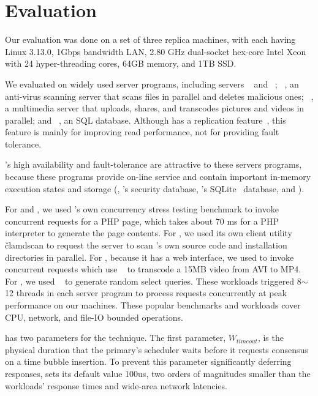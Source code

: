\section{Evaluation} \label{sec:eval}

Our evaluation was done on a set of three replica machines, with each having 
Linux 3.13.0, 1Gbps bandwidth LAN, 2.80 GHz dual-socket hex-core Intel Xeon 
with 24 hyper-threading cores, 64GB memory, and 1TB SSD.

We evaluated \xxx on \nprog widely used server programs, 
including \http servers \apache~\cite{apache} and \mongoose~\cite{mongoose}; 
\clamav~\cite{clamav}, an anti-virus scanning 
server that scans files in parallel and deletes malicious ones; 
\mediatomb~\cite{mediatomb}, a \upnp multimedia server that uploads, shares, 
and transcodes pictures and videos in parallel; and \mysql~\cite{mysql}, an 
SQL database. Although \mysql has a replication 
feature~\cite{mysql:replication}, this feature is mainly for improving read 
performance, not for providing \smr fault tolerance.

\smr's high availability and fault-tolerance are attractive to these 
servers programs, because these programs provide on-line service and contain 
important in-memory execution states and storage (\eg, \clamav's 
security database, \mediatomb's SQLite~\cite{sqlite} database, and \mysql).

For \apache and \mongoose, we used \apache's own concurrency stress testing 
benchmark \ab to invoke concurrent \http requests for a PHP page, which takes 
about 70 ms for a PHP interpreter to generate the page contents. For \clamav, 
we used its own client utility \v{clamdscan} to request the server to scan 
\clamav's own source code and installation directories in parallel. For 
\mediatomb, because it has a web interface, we used \ab to invoke concurrent 
requests which use \mencoder~\cite{mencoder} to transcode a 15MB video from AVI 
to MP4. For \mysql, we used \sysbench~\cite{sysbench} to generate random select 
queries. These workloads triggered 8$\sim$12 threads in each server program to 
process requests concurrently at peak performance on our machines. These 
popular benchmarks and workloads cover CPU, network, and file-IO 
bounded operations.  


\xxx has two parameters for the \timealgo technique. The first 
parameter, $W_{timeout}$, is the physical duration that the primary's \dmt 
scheduler waits before it requests consensus on a time bubble insertion. To 
prevent this parameter significantly deferring responses, \xxx sets its 
default value 100us, two orders of magnitudes smaller than the workloads' 
response times and wide-area network latencies.

